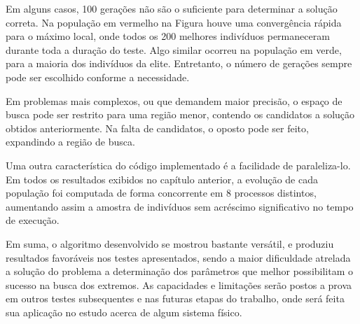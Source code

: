 Em alguns casos, 100 gerações não são o suficiente para determinar a solução correta. Na população
em vermelho na Figura  houve uma convergência rápida para o
máximo local, onde todos os 200 melhores indivíduos permaneceram durante toda a duração do teste.
Algo similar ocorreu na população em verde, para a maioria dos indivíduos da elite. Entretanto, 
o número de gerações sempre pode ser escolhido conforme a necessidade.

Em problemas mais complexos, ou que demandem maior precisão, o espaço de busca pode ser restrito
para uma região menor, contendo os candidatos a solução obtidos anteriormente. Na falta de
candidatos, o oposto pode ser feito, expandindo a região de busca. 

Uma outra característica 
do código implementado é a facilidade de paraleliza-lo. Em todos os resultados exibidos no capítulo
anterior, a evolução de cada população foi computada de forma concorrente em 8 processos distintos,
aumentando assim a amostra de indivíduos sem acréscimo significativo no tempo de execução.

Em suma, o algoritmo desenvolvido se mostrou bastante versátil, e produziu resultados favoráveis nos 
testes apresentados, sendo a maior dificuldade atrelada a solução do problema a determinação dos
parâmetros que melhor possibilitam o sucesso na busca dos extremos. As capacidades e limitações serão postos
a prova em outros testes subsequentes e nas futuras etapas do trabalho, onde será feita sua aplicação 
no estudo acerca de algum sistema físico.

\nocite{ribeiro2013ga}